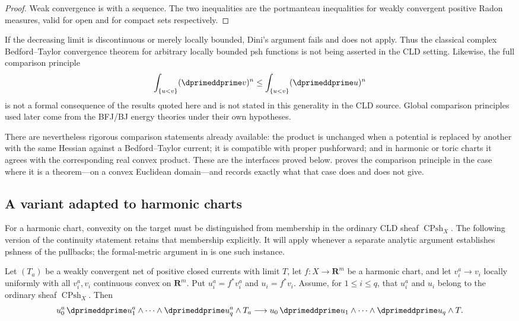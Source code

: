 \begin{proof}
Weak convergence is  with a sequence.  The
two inequalities are the portmanteau inequalities for weakly convergent
positive Radon measures, valid for open and for compact sets respectively.
\end{proof}

\begin{remark}
\label{rem:ch16-not-claimed}
If the decreasing limit is discontinuous or merely locally bounded, Dini's
argument fails and  does not apply.  Thus
the classical complex Bedford--Taylor convergence theorem for arbitrary
locally bounded psh functions is not being asserted in the CLD setting.
Likewise, the full comparison principle
\[
 \int_{\{u<v\}}(\dprimeddprime v)^n
 \leq\int_{\{u<v\}}(\dprimeddprime u)^n
\]
is not a formal consequence of the results quoted here and is not stated in
this generality in the CLD source.  Global comparison principles used later
come from the BFJ/BJ energy theories under their own hypotheses.
\end{remark}

There are nevertheless rigorous comparison statements already available:
the product is unchanged when a potential is replaced by another with the
same Hessian against a Bedford--Taylor current; it is compatible with proper
pushforward; and in harmonic or toric charts it agrees with the corresponding
real convex product.  These are the interfaces proved below.
 proves the comparison principle in the case where
it is a theorem---on a convex Euclidean domain---and
records exactly what that case does and does not give.

\subsection{A variant adapted to harmonic charts}
\label{sec:ch16-harmonic-continuity}

For a harmonic chart, convexity on the target must be distinguished from
membership in the ordinary CLD sheaf $\operatorname{CPsh}_X$.  The following
version of the continuity statement retains that membership explicitly.
It will apply whenever a separate analytic argument establishes pshness of
the pullbacks; the formal-metric argument in
 is one such instance.

\begin{proposition}
\label{prop:ch16-harmonic-continuity}
Let $(T_a)$ be a weakly convergent net of positive closed currents with
limit $T$, let $f:X\to\mathbf R^m$ be a harmonic chart, and let
$v_i^a\to v_i$ locally uniformly with all $v_i^a,v_i$ continuous convex on
$\mathbf R^m$.  Put $u_i^a=f^*v_i^a$ and $u_i=f^*v_i$.  Assume, for
$1\leq i\leq q$, that $u_i^a$ and $u_i$ belong to the ordinary sheaf
$\operatorname{CPsh}_X$.  Then
\[
 u_0^a\,\dprimeddprime u_1^a\wedge\cdots\wedge\dprimeddprime u_q^a\wedge T_a
 \longrightarrow
 u_0\,\dprimeddprime u_1\wedge\cdots\wedge\dprimeddprime u_q\wedge T .
\]
\end{proposition}

